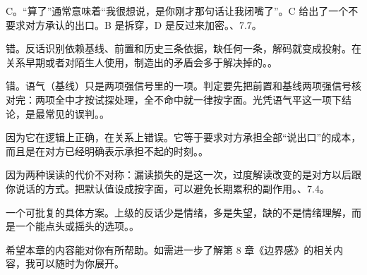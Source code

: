 \begin{answerssec}
\item C。“算了”通常意味着“我很想说，是你刚才那句话让我闭嘴了”。C 给出了一个不要求对方承认的出口。B 是拆穿，D 是反过来加密。、7.7。

\item 错。反话识别依赖基线、前置和历史三条依据，缺任何一条，解码就变成投射。在关系早期或者对陌生人使用，制造出的矛盾会多于解决掉的。。

\item 错。语气（基线）只是两项强信号里的一项。判定要先把前置和基线两项强信号核对完：两项全中才按试探处理，全不命中就一律按字面。光凭语气平这一项下结论，是最常见的误判。。

\item 因为它在逻辑上正确，在关系上错误。它等于要求对方承担全部“说出口”的成本，而且是在对方已经明确表示承担不起的时刻。。

\item 因为两种误读的代价不对称：漏读损失的是这一次，过度解读改变的是对方以后跟你说话的方式。把默认值设成按字面，可以避免长期累积的副作用。、7.4。

\item 一个可批复的具体方案。上级的反话少是情绪，多是失望，缺的不是情绪理解，而是一个能点头或摇头的选项。。
\end{answerssec}

\hcirule

\begin{qabox}
\end{qabox}

\hcirule

希望本章的内容能对你有所帮助。如需进一步了解第 8 章《边界感》的相关内容，我可以随时为你展开。

